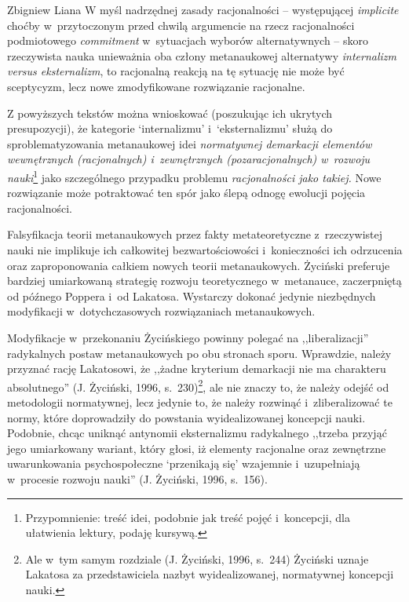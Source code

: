 \begin{artplenv}{Zbigniew Liana}
W myśl nadrzędnej zasady racjonalności -- występującej \textit{implicite} choćby w~przytoczonym przed chwilą argumencie na
rzecz racjonalności podmiotowego \textit{commitment} w~sytuacjach wyborów alternatywnych -- skoro rzeczywista nauka
unieważnia oba człony metanaukowej alternatywy \textit{internalizm versus eksternalizm}, to racjonalną reakcją na tę
sytuację nie może być sceptycyzm, lecz nowe zmodyfikowane rozwiązanie racjonalne.

Z powyższych tekstów można wnioskować (poszukując ich ukrytych presupozycji), że kategorie
`internalizmu' i~`eksternalizmu' służą do sproblematyzowania metanaukowej idei \textit{normatywnej demarkacji
elementów wewnętrznych
(racjonalnych) i~zewnętrznych (pozaracjonalnych) w~rozwoju nauki}\footnote{Przypomnienie: treść idei, podobnie jak
treść pojęć i~koncepcji, dla ułatwienia lektury, podaję kursywą.} jako szczególnego przypadku problemu
\textit{racjonalności jako takiej. }Nowe rozwiązanie może potraktować ten spór jako ślepą odnogę ewolucji pojęcia
racjonalności.

Falsyfikacja teorii metanaukowych przez fakty metateoretyczne z~rzeczywistej nauki nie implikuje ich całkowitej
bezwartościowości i~konieczności ich odrzucenia oraz zaproponowania całkiem nowych teorii metanaukowych. Życiński
preferuje bardziej umiarkowaną strategię rozwoju teoretycznego w~metanauce, zaczerpniętą od późnego Poppera i~od
Lakatosa. Wystarczy dokonać jedynie niezbędnych modyfikacji w~dotychczasowych rozwiązaniach metanaukowych. 

Modyfikacje w~przekonaniu Życińskiego powinny polegać na ,,liberalizacji'' radykalnych postaw metanaukowych po obu
stronach sporu. Wprawdzie, należy przyznać rację Lakatosowi, że ,,żadne kryterium demarkacji nie ma charakteru
absolutnego'' \label{ref:RNDlahtfGg0vv}(J. Życiński, 1996, s.~230)\footnote{Ale w~tym samym rozdziale
\label{ref:RNDU4zrzQHMRM}(J. Życiński, 1996, s.~244) Życiński uznaje Lakatosa za przedstawiciela nazbyt
wyidealizowanej, normatywnej koncepcji nauki.}, ale nie znaczy to, że należy odejść od metodologii normatywnej, lecz
jedynie to, że należy rozwinąć i~zliberalizować te normy, które doprowadziły do powstania wyidealizowanej koncepcji
nauki. Podobnie, chcąc uniknąć antynomii eksternalizmu radykalnego ,,trzeba przyjąć jego umiarkowany wariant, który
głosi, iż elementy racjonalne oraz zewnętrzne uwarunkowania psychospołeczne `przenikają się'
wzajemnie i~uzupełniają w~procesie rozwoju nauki'' \label{ref:RND0qiCuFReRd}(J. Życiński, 1996, s.~156).


\end{artplenv}
